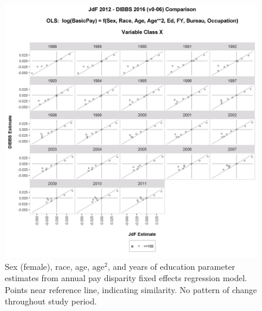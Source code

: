 \documentclass[10pt, letterpaper]{article}
\begin{document}
\begin{spacing}{1.0}
\begin{figure}[]
    \centering
    \includegraphics[width=6in, trim={0 0 0 1in}, clip]{DIBBSEstimateVsJdFEstimateNoInterceptGSPayPlanFixedRefLevel-X.png}
    \caption{Sex (female), race, age, $\text{age}^2$, and years of education parameter estimates from annual pay disparity fixed effects regression model.  Points near reference line, indicating similarity.  No pattern of change throughout study period.}
    \label{figure:DIBBSEstimateVsJdFEstimateNoInterceptGSPayPlanFixedRefLevel-X}
\end{figure}

\clearpage


\end{spacing}
\end{document}
